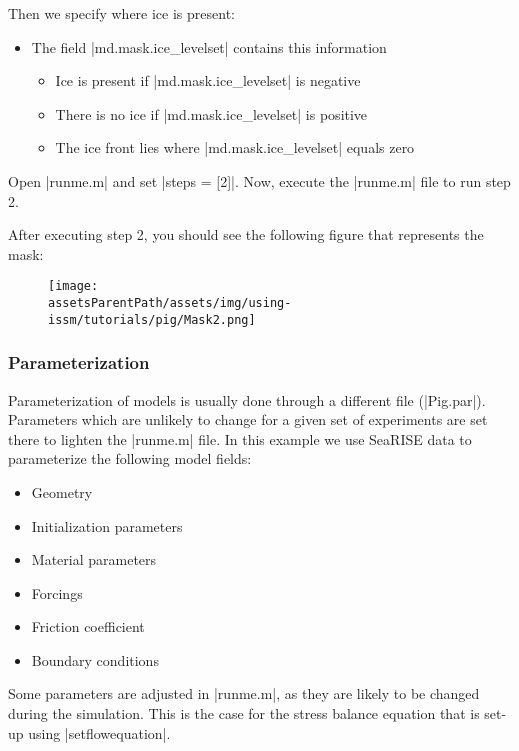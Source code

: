 Then we specify where ice is present:
\begin{itemize}
	\item The field \lstinlinebg|md.mask.ice_levelset| contains this information
		\begin{itemize}
			\item Ice is present if \lstinlinebg|md.mask.ice_levelset| is negative
			\item There is no ice if \lstinlinebg|md.mask.ice_levelset| is positive
			\item The ice front lies where \lstinlinebg|md.mask.ice_levelset| equals zero
		\end{itemize}
\end{itemize}

Open \lstinlinebg|runme.m| and set \lstinlinebg|steps = [2]|. Now, execute the \lstinlinebg|runme.m| file to run step 2.

After executing step 2, you should see the following figure that represents the mask:
\begin{figure}[H]
	\begin{center}
		\texttt{[image: \\assetsParentPath/assets/img/using-issm/tutorials/pig/Mask2.png]}
	\end{center}
\end{figure}
\subsubsection{Parameterization}%
Parameterization of models is usually done through a different file (\lstinlinebg|Pig.par|). Parameters which are unlikely to change for a given set of experiments are set there to lighten the \lstinlinebg|runme.m| file. In this example we use SeaRISE data to parameterize the following model fields:
\begin{itemize}
	\item Geometry
	\item Initialization parameters
	\item Material parameters
	\item Forcings
	\item Friction coefficient
	\item Boundary conditions
\end{itemize}

Some parameters are adjusted in \lstinlinebg|runme.m|, as they are likely to be changed during the simulation. This is the case for the stress balance equation that is set-up using \lstinlinebg|setflowequation|.

